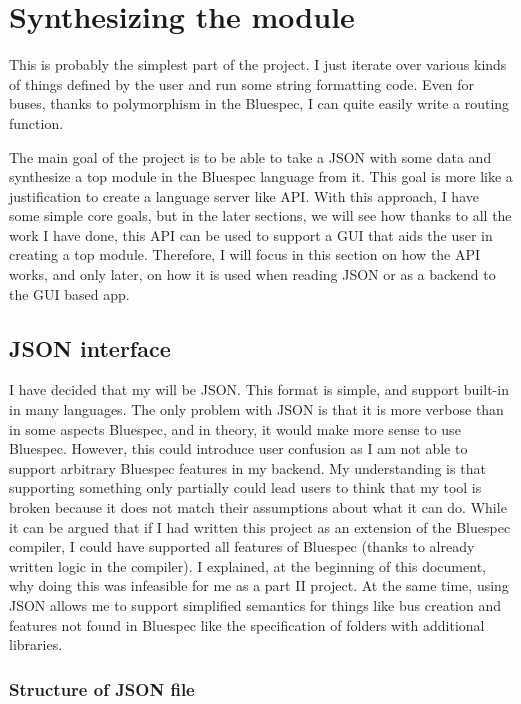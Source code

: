 \documentclass[12pt]{report}
\begin{document}
\section{Synthesizing the module}
This is probably the simplest part of the project. I just iterate over various kinds of things defined by the user and run some string formatting code. Even for buses, thanks to polymorphism in the Bluespec, I can quite easily write a routing function. 
  
  
The main goal of the project is to be able to take a JSON with some data and synthesize a top module in the Bluespec language from it. This goal is more like a justification to create a language server like API. With this approach, I have some simple core goals, but in the later sections, we will see how thanks to all the work I have done, this API can be used to support a GUI that aids the user in creating a top module. Therefore, I will focus in this section on how the API works, and only later, on how it is used when reading JSON or as a backend to the GUI based app. 
  
  
\subsection{JSON interface}
I have decided that my  will be JSON. This format is simple, and support built-in in many languages.
The only problem with JSON is that it is more verbose than in some aspects Bluespec, and in theory, it would make more sense to use Bluespec.
However, this could introduce user confusion as I am not able to support arbitrary Bluespec features in my backend.
My understanding is that supporting something only partially could lead users to think that my tool is broken because it does not match their assumptions about what it can do.
While it can be argued that if I had written this project as an extension of the Bluespec compiler, I could have supported all features of Bluespec (thanks to already written logic in the compiler).
I explained, at the beginning of this document, why doing this was infeasible for me as a part II project.
At the same time, using JSON allows me to support simplified semantics for things like bus creation and features not found in Bluespec like the specification of folders with additional libraries.

\subsubsection{Structure of JSON file}
\end{document}
